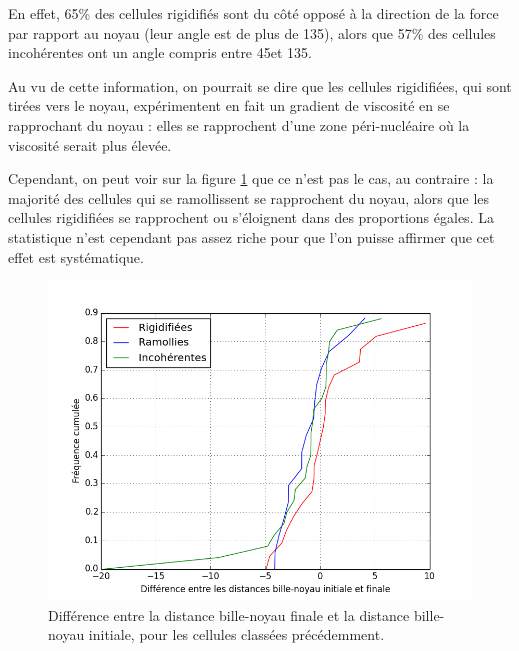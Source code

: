 \documentclass{report}
\begin{document}
En effet, 65\% des cellules rigidifiés sont du côté opposé à la direction de la force par rapport au noyau (leur angle est de plus de 135\degres ), alors que 57\% des cellules incohérentes ont un angle compris entre 45\degres et 135\degres . 

Au vu de cette information, on pourrait se dire que les cellules rigidifiées, qui sont tirées vers le noyau, expérimentent en fait un gradient de viscosité en se rapprochant du noyau : elles se rapprochent d'une zone péri-nucléaire où la viscosité serait plus élevée. 

Cependant, on peut voir sur la figure \ref{DBN} que ce n'est pas le cas, au contraire : la majorité des cellules qui se ramollissent se rapprochent du noyau, alors que les cellules rigidifiées se rapprochent ou s'éloignent dans des proportions égales. La statistique n'est cependant pas assez riche pour que l'on puisse affirmer que cet effet est systématique.

\begin{figure}
\includegraphics[scale=0.5]{Figures/Evolution_DBN.png}
\caption{Différence entre la distance bille-noyau finale et la distance bille-noyau initiale, pour les cellules classées précédemment. \label{DBN}}
\end{figure}

 
 
 
\end{document}
